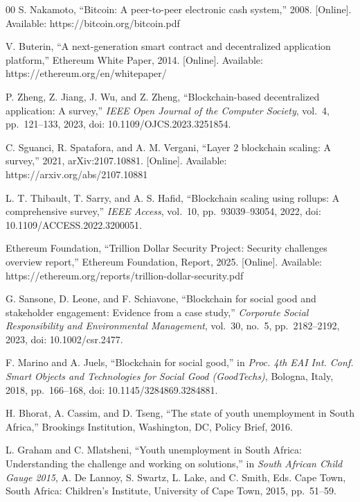 \documentclass[conference]{IEEEtran}
\begin{document}
\begin{thebibliography}{00}
	 S. Nakamoto, ``Bitcoin: A peer-to-peer electronic cash system,'' 2008. [Online]. Available: https://bitcoin.org/bitcoin.pdf

	 V. Buterin, ``A next-generation smart contract and decentralized application platform,'' Ethereum White Paper, 2014. [Online]. Available: https://ethereum.org/en/whitepaper/

	 P. Zheng, Z. Jiang, J. Wu, and Z. Zheng, ``Blockchain-based decentralized application: A survey,'' \emph{IEEE Open Journal of the Computer Society}, vol.~4, pp.~121--133, 2023, doi: 10.1109/OJCS.2023.3251854.

	 C. Sguanci, R. Spatafora, and A. M. Vergani, ``Layer 2 blockchain scaling: A survey,'' 2021, arXiv:2107.10881. [Online]. Available: https://arxiv.org/abs/2107.10881

	 L. T. Thibault, T. Sarry, and A. S. Hafid, ``Blockchain scaling using rollups: A comprehensive survey,'' \emph{IEEE Access}, vol.~10, pp.~93039--93054, 2022, doi: 10.1109/ACCESS.2022.3200051.

	 Ethereum Foundation, ``Trillion Dollar Security Project: Security challenges overview report,'' Ethereum Foundation, Report, 2025. [Online]. Available: https://ethereum.org/reports/trillion-dollar-security.pdf

	 G. Sansone, D. Leone, and F. Schiavone, ``Blockchain for social good and stakeholder engagement: Evidence from a case study,'' \emph{Corporate Social Responsibility and Environmental Management}, vol.~30, no.~5, pp.~2182--2192, 2023, doi: 10.1002/csr.2477.

	 F. Marino and A. Juels, ``Blockchain for social good,'' in \emph{Proc. 4th EAI Int. Conf. Smart Objects and Technologies for Social Good (GoodTechs)}, Bologna, Italy, 2018, pp.~166--168, doi: 10.1145/3284869.3284881.

	 H. Bhorat, A. Cassim, and D. Tseng, ``The state of youth unemployment in South Africa,'' Brookings Institution, Washington, DC, Policy Brief, 2016.

	 L. Graham and C. Mlatsheni, ``Youth unemployment in South Africa: Understanding the challenge and working on solutions,'' in \emph{South African Child Gauge 2015}, A. De Lannoy, S. Swartz, L. Lake, and C. Smith, Eds. Cape Town, South Africa: Children's Institute, University of Cape Town, 2015, pp.~51--59.


\end{thebibliography}
\end{document}
